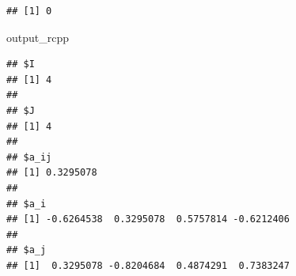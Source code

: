 \documentclass[]{book}
\newenvironment{Shaded}{\begin{snugshade}}{\end{snugshade}}
\newcommand{\NormalTok}[1]{#1}
\begin{document}
\begin{verbatim}
## [1] 0
\end{verbatim}

\begin{Shaded}
\begin{Highlighting}[]
\NormalTok{output_rcpp }
\end{Highlighting}
\end{Shaded}

\begin{verbatim}
## $I
## [1] 4
## 
## $J
## [1] 4
## 
## $a_ij
## [1] 0.3295078
## 
## $a_i
## [1] -0.6264538  0.3295078  0.5757814 -0.6212406
## 
## $a_j
## [1]  0.3295078 -0.8204684  0.4874291  0.7383247
\end{verbatim}


\end{document}
